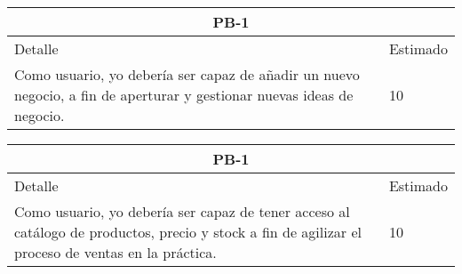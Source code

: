 \begin{table}[htbp]
	\begin{center}
		\begin{tabular}{| p{12cm} | p{2cm} |}
			\hline
			\multicolumn{2}{|c|}{PB-1}\\
			\hline
			Detalle & Estimado \\
			\hline
			Como usuario, yo debería ser capaz de añadir un nuevo negocio, a fin de aperturar y gestionar nuevas ideas de negocio.& 10 \\
			\hline	
		\end{tabular}
	\end{center}
\end{table}
\begin{table}[htbp]
	\begin{center}
		\begin{tabular}{| p{12cm} | p{2cm} |}
			\hline
			\multicolumn{2}{|c|}{PB-1}\\
			\hline
			Detalle & Estimado \\
			\hline
			Como usuario, yo debería ser capaz de tener acceso al catálogo de productos, precio y stock a fin de agilizar el proceso de ventas en la práctica.& 10 \\
			\hline	
		\end{tabular}
	\end{center}
\end{table}


